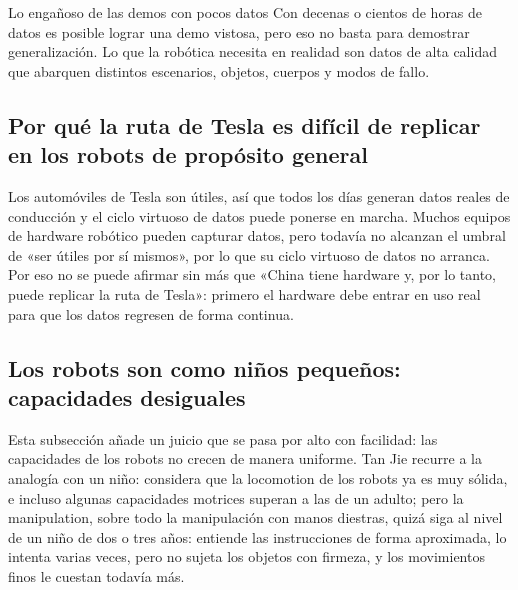 \begin{warningbox}{Lo engañoso de las demos con pocos datos}
Con decenas o cientos de horas de datos es posible lograr una demo vistosa, pero eso no basta para demostrar generalización. Lo que la robótica necesita en realidad son datos de alta calidad que abarquen distintos escenarios, objetos, cuerpos y modos de fallo.
\end{warningbox}

\subsection{Por qué la ruta de Tesla es difícil de replicar en los robots de propósito general}

Los automóviles de Tesla son útiles, así que todos los días generan datos reales de conducción y el ciclo virtuoso de datos puede ponerse en marcha. Muchos equipos de hardware robótico pueden capturar datos, pero todavía no alcanzan el umbral de «ser útiles por sí mismos», por lo que su ciclo virtuoso de datos no arranca. Por eso no se puede afirmar sin más que «China tiene hardware y, por lo tanto, puede replicar la ruta de Tesla»: primero el hardware debe entrar en uso real para que los datos regresen de forma continua.

\subsection{Los robots son como niños pequeños: capacidades desiguales}

Esta subsección añade un juicio que se pasa por alto con facilidad: las capacidades de los robots no crecen de manera uniforme. Tan Jie recurre a la analogía con un niño: considera que la locomotion de los robots ya es muy sólida, e incluso algunas capacidades motrices superan a las de un adulto; pero la manipulation, sobre todo la manipulación con manos diestras, quizá siga al nivel de un niño de dos o tres años: entiende las instrucciones de forma aproximada, lo intenta varias veces, pero no sujeta los objetos con firmeza, y los movimientos finos le cuestan todavía más.

